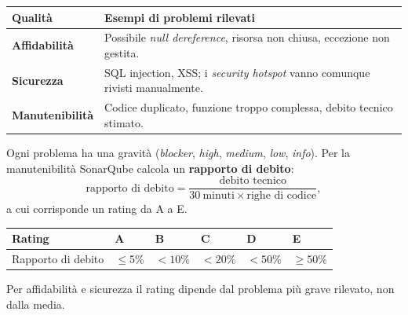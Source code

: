 \documentclass[12pt]{extarticle}
\begin{document}
\begin{center}
\small
\begin{tabular}{p{3.0cm}p{13.2cm}}
    \toprule
    \textbf{Qualità} & \textbf{Esempi di problemi rilevati} \\
    \midrule
    \textbf{Affidabilità} & Possibile \textit{null dereference}, risorsa non chiusa, eccezione non gestita. \\
    \addlinespace
    \textbf{Sicurezza} & SQL injection, XSS; i \textit{security hotspot} vanno comunque rivisti manualmente. \\
    \addlinespace
    \textbf{Manutenibilità} & Codice duplicato, funzione troppo complessa, debito tecnico stimato. \\
    \bottomrule
\end{tabular}
\end{center}

\noindent Ogni problema ha una gravità (\textit{blocker}, \textit{high}, \textit{medium}, \textit{low}, \textit{info}). Per la manutenibilità SonarQube calcola un \textbf{rapporto di debito}:
\[
\text{rapporto di debito} = \frac{\text{debito tecnico}}{30\ \text{minuti} \times \text{righe di codice}},
\]
a cui corrisponde un rating da A a E.

\begin{center}
\small
\begin{tabular}{p{2.0cm}p{2.4cm}p{2.4cm}p{2.4cm}p{2.4cm}p{2.4cm}}
    \toprule
    \textbf{Rating} & \textbf{A} & \textbf{B} & \textbf{C} & \textbf{D} & \textbf{E} \\
    \midrule
    Rapporto di debito & $\le 5\%$ & $<10\%$ & $<20\%$ & $<50\%$ & $\ge 50\%$ \\
    \bottomrule
\end{tabular}
\end{center}

\noindent Per affidabilità e sicurezza il rating dipende dal problema più grave rilevato, non dalla media.
\end{document}
